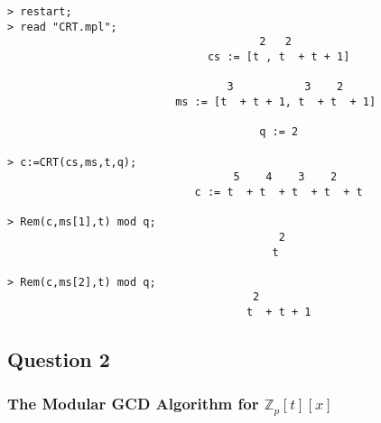\documentclass[10pt]{report}
\theoremstyle{plain}
\theoremstyle{definition}
\begin{document}
\begin{verbatim}
> restart;
> read "CRT.mpl";
                                       2   2
                               cs := [t , t  + t + 1]

                                  3           3    2
                          ms := [t  + t + 1, t  + t  + 1]

                                       q := 2

> c:=CRT(cs,ms,t,q);   
                                   5    4    3    2
                             c := t  + t  + t  + t  + t

> Rem(c,ms[1],t) mod q;
                                          2
                                         t

> Rem(c,ms[2],t) mod q;
                                      2
                                     t  + t + 1

\end{verbatim}

\clearpage
\subsection*{Question 2}
\subsubsection*{The Modular GCD Algorithm for $\mathbb{Z}_p[t][x]$ }
\end{document}
